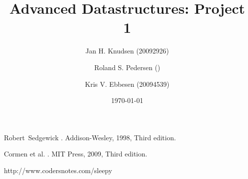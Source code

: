 \documentclass[a4paper, 12pt]{article}
\title{Advanced Datastructures: Project 1}
\date{\today}
\author{Jan H. Knudsen (20092926)
\and
Roland S. Pedersen ()
\and
Kris V. Ebbesen (20094539)
}
\begin{document}
\maketitle

\newpage
\tableofcontents
\newpage


















\begin{thebibliography}{9}

Robert~Sedgewick
.
\newblock Addison-Wesley, 1998, Third edition.

Cormen et al.
.
\newblock MIT Press, 2009, Third edition.

http://www.codersnotes.com/sleepy



\end{thebibliography}
\end{document}
